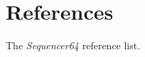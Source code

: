 %
%
%

\section{References}
\label{sec:seq64_references}

   The \textsl{Sequencer64} reference list.

